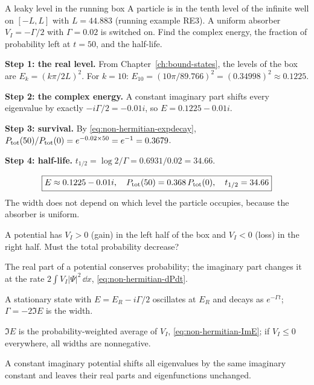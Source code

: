 \begin{sample}{A leaky level in the running box}
A particle is in the tenth level of the infinite well on $[-L,L]$ with $L=44.883$ (running example RE3). A uniform absorber $V_I=-\Gamma/2$ with $\Gamma=0.02$ is switched on. Find the complex energy, the fraction of probability left at $t=50$, and the half-life.

\textbf{Step 1: the real level.} From Chapter~\ref{ch:bound-states}, the levels of the box are $E_k=(k\pi/2L)^2$. For $k=10$: $E_{10}=(10\pi/89.766)^2 = (0.34998)^2 \approx 0.1225$.

\textbf{Step 2: the complex energy.} A constant imaginary part shifts every eigenvalue by exactly $-i\Gamma/2=-0.01i$, so $E = 0.1225 - 0.01i$.

\textbf{Step 3: survival.} By \eqref{eq:non-hermitian-expdecay}, $P_{\rm tot}(50)/P_{\rm tot}(0)=e^{-0.02\times50}=e^{-1}=0.3679$.

\textbf{Step 4: half-life.} $t_{1/2}=\log2/\Gamma = 0.6931/0.02 = 34.66$.

\[
\boxed{E\approx 0.1225-0.01i,\quad P_{\rm tot}(50)=0.368\,P_{\rm tot}(0),\quad t_{1/2}=34.66}
\]
The width does not depend on which level the particle occupies, because the absorber is uniform.
\end{sample}

\begin{checkpoint}
A potential has $V_I>0$ (gain) in the left half of the box and $V_I<0$ (loss) in the right half. Must the total probability decrease?
\end{checkpoint}

\begin{keyideas}
\item The real part of a potential conserves probability; the imaginary part changes it at the rate $2\int V_I|\Psi|^2\,\dd x$, \eqref{eq:non-hermitian-dPdt}.
\item A stationary state with $E=E_R-i\Gamma/2$ oscillates at $E_R$ and decays as $e^{-\Gamma t}$; $\Gamma=-2\Im E$ is the width.
\item $\Im E$ is the probability-weighted average of $V_I$, \eqref{eq:non-hermitian-ImE}; if $V_I\le0$ everywhere, all widths are nonnegative.
\item A constant imaginary potential shifts all eigenvalues by the same imaginary constant and leaves their real parts and eigenfunctions unchanged.
\end{keyideas}

